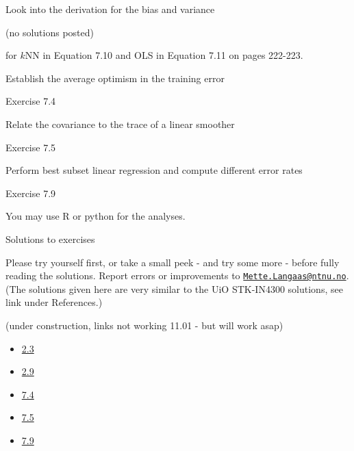 \documentclass[
  ignorenonframetext,
]{beamer}
\providecommand{\tightlist}{%
  \setlength{\itemsep}{0pt}\setlength{\parskip}{0pt}}
\begin{document}
\begin{frame}

\begin{block}{Look into the derivation for the bias and variance}

(no solutions posted)

for \(k\)NN in Equation 7.10 and OLS in Equation 7.11 on pages 222-223.

\end{block}

\begin{block}{Establish the average optimism in the training error}

Exercise 7.4

\end{block}

\begin{block}{Relate the covariance to the trace of a linear smoother}

Exercise 7.5

\end{block}

\begin{block}{Perform best subset linear regression and compute
different error rates}

Exercise 7.9

You may use R or python for the analyses.

\end{block}

\end{frame}

\begin{frame}{Solutions to exercises}
\protect\hypertarget{solutions-to-exercises}{}

Please try yourself first, or take a small peek - and try some more -
before fully reading the solutions. Report errors or improvements to
\href{mailto:Mette.Langaas@ntnu.no}{\nolinkurl{Mette.Langaas@ntnu.no}}.
(The solutions given here are very similar to the UiO STK-IN4300
solutions, see link under References.)

(under construction, links not working 11.01 - but will work asap)

\begin{itemize}
\tightlist
\item
  \href{https://github.com/mettelang/MA8701V2021/blob/main/ELSe23.pdf}{2.3}
\item
  \href{https://github.com/mettelang/MA8701V2021/blob/main/ELSe29.pdf}{2.9}
\item
  \href{https://github.com/mettelang/MA8701V2021/blob/main/ELSe74.pdf}{7.4}
\item
  \href{https://github.com/mettelang/MA8701V2021/blob/main/ELSe75.pdf}{7.5}
\item
  \href{https://github.com/mettelang/MA8701V2021/blob/main/ELSe79.html}{7.9}
\end{itemize}

\end{frame}
\end{document}
